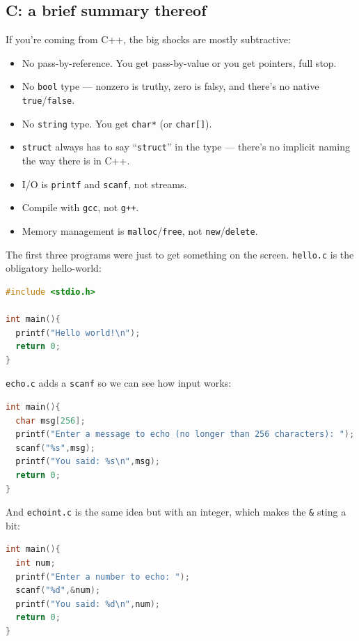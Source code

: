 \documentclass[11pt]{article}
\begin{document}
\subsection*{C: a brief summary thereof}

If you're coming from C++, the big shocks are mostly subtractive:
\begin{itemize}
  \item No pass-by-reference. You get pass-by-value or you get
    pointers, full stop.
  \item No \texttt{bool} type --- nonzero is truthy, zero is falsy,
    and there's no native \texttt{true}/\texttt{false}.
  \item No \texttt{string} type. You get \texttt{char*} (or
    \texttt{char[]}).
  \item \texttt{struct} always has to say ``\texttt{struct}'' in the
    type --- there's no implicit naming the way there is in C++.
  \item I/O is \texttt{printf} and \texttt{scanf}, not streams.
  \item Compile with \texttt{gcc}, not \texttt{g++}.
  \item Memory management is \texttt{malloc}/\texttt{free}, not
    \texttt{new}/\texttt{delete}.
\end{itemize}

The first three programs were just to get something on the screen.
\texttt{hello.c} is the obligatory hello-world:

\begin{lstlisting}[language=C]
#include <stdio.h>

int main(){
  printf("Hello world!\n");
  return 0;
}
\end{lstlisting}

\texttt{echo.c} adds a \texttt{scanf} so we can see how input works:

\begin{lstlisting}[language=C]
int main(){
  char msg[256];
  printf("Enter a message to echo (no longer than 256 characters): ");
  scanf("%s",msg);
  printf("You said: %s\n",msg);
  return 0;
}
\end{lstlisting}

And \texttt{echoint.c} is the same idea but with an integer, which
makes the \texttt{\&} sting a bit:

\begin{lstlisting}[language=C]
int main(){
  int num;
  printf("Enter a number to echo: ");
  scanf("%d",&num);
  printf("You said: %d\n",num);
  return 0;
}
\end{lstlisting}
\end{document}
